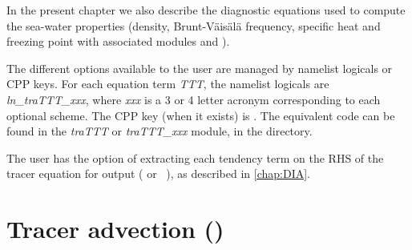 \documentclass[../main/NEMO_manual]{subfiles}
\begin{document}
In the present chapter we also describe the diagnostic equations used to compute the sea-water properties
(density, Brunt-V\"{a}is\"{a}l\"{a} frequency, specific heat and freezing point with
associated modules  and ).

The different options available to the user are managed by namelist logicals or CPP keys.
For each equation term \textit{TTT}, the namelist logicals are \textit{ln\_traTTT\_xxx},
where \textit{xxx} is a 3 or 4 letter acronym corresponding to each optional scheme.
The CPP key (when it exists) is .
The equivalent code can be found in the \textit{traTTT} or \textit{traTTT\_xxx} module,
in the  directory.

The user has the option of extracting each tendency term on the RHS of the tracer equation for output
( or ~), as described in \autoref{chap:DIA}.

\section{Tracer advection (\protect{})}
\label{sec:TRA_adv}

\end{document}
